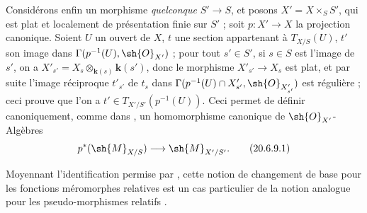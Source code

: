 \begin{env}[20.6.9]
\label{IV.20.6.9}
Considérons enfin un morphisme \emph{quelconque} $S'\to S$, et posons $X'=X\times_S S'$, qui est plat et localement de présentation finie sur $S'$ ; soit $p:X'\to X$ la projection canonique.
Soient $U$ un ouvert de $X$, $t$ une section appartenant à $T_{X/S}(U)$, $t'$ son image dans $\Gamma(p^{-1}(U),\sh{O}_{X'})$ ; pour tout $s'\in S'$, si $s\in S$ est l'image de $s'$, on a $X'_{s'}=X_s\otimes_{\mathbf{k}(s)}\boldsymbol{k}(s')$, donc le morphisme $X'_{s'}\to X_s$ est plat, et par suite  l'image réciproque $t'_{s'}$ de $t_s$ dans $\Gamma(p^{-1}(U)\cap X'_{s'},\sh{O}_{X'_{s'}})$ est régulière ; ceci prouve que l'on a $t'\in T_{X'/S'}(p^{-1}(U))$.
Ceci permet de définir canoniquement, comme dans , un homomorphisme canonique de $\sh{O}_{X'}$-Algèbres
\[
\label{IV.20.6.9.1}
  p^*(\sh{M}_{X/S})\to\sh{M}_{X'/S'}.
  \tag{20.6.9.1}
\]

Moyennant l'identification permise par , cette notion de changement de base pour les fonctions méromorphes relatives est un cas particulier de la notion analogue pour les pseudo-morphismes relatifs .
\end{env}
